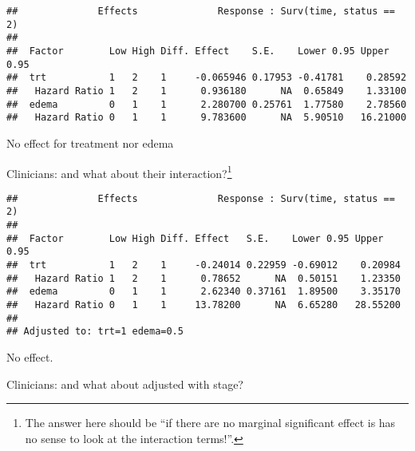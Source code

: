 \documentclass[]{book}
\newenvironment{Shaded}{\begin{snugshade}}{\end{snugshade}}
\newcommand{\KeywordTok}[1]{\textcolor[rgb]{0.13,0.29,0.53}{\textbf{{#1}}}}
\newcommand{\DataTypeTok}[1]{\textcolor[rgb]{0.13,0.29,0.53}{{#1}}}
\newcommand{\DecValTok}[1]{\textcolor[rgb]{0.00,0.00,0.81}{{#1}}}
\newcommand{\StringTok}[1]{\textcolor[rgb]{0.31,0.60,0.02}{{#1}}}
\newcommand{\NormalTok}[1]{{#1}}
\let\rmarkdownfootnote\footnote%
\def\footnote{\protect\rmarkdownfootnote}
\theoremstyle{definition}
\theoremstyle{definition}
\theoremstyle{definition}
\theoremstyle{remark}
\begin{document}
\begin{verbatim}
##              Effects              Response : Surv(time, status == 2) 
## 
##  Factor        Low High Diff. Effect    S.E.    Lower 0.95 Upper 0.95
##  trt           1   2    1     -0.065946 0.17953 -0.41781    0.28592  
##   Hazard Ratio 1   2    1      0.936180      NA  0.65849    1.33100  
##  edema         0   1    1      2.280700 0.25761  1.77580    2.78560  
##   Hazard Ratio 0   1    1      9.783600      NA  5.90510   16.21000
\end{verbatim}

No effect for treatment nor edema

Clinicians: and what about their interaction?\footnote{The answer here
  should be ``if there are no marginal significant effect is has no
  sense to look at the interaction terms!''.}

\begin{Shaded}
\end{Shaded}

\begin{verbatim}
##              Effects              Response : Surv(time, status == 2) 
## 
##  Factor        Low High Diff. Effect   S.E.    Lower 0.95 Upper 0.95
##  trt           1   2    1     -0.24014 0.22959 -0.69012    0.20984  
##   Hazard Ratio 1   2    1      0.78652      NA  0.50151    1.23350  
##  edema         0   1    1      2.62340 0.37161  1.89500    3.35170  
##   Hazard Ratio 0   1    1     13.78200      NA  6.65280   28.55200  
## 
## Adjusted to: trt=1 edema=0.5
\end{verbatim}

No effect.

Clinicians: and what about adjusted with stage?

\begin{Shaded}
\end{Shaded}
\end{document}
